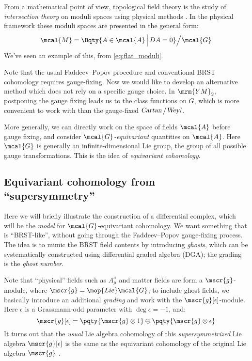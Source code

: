 \documentclass[a4paper
	,10pt
]{article}
\newcommand{\YM}{{\ensuremath{\mrm{YM}_2}}\xspace}
\begin{document}
	From a mathematical point of view, topological field theory is the study of \textit{intersection theory} on moduli spaces using physical methods \cite{Cordes:1994fc,Witten:1990bs}. In the physical framework these moduli spaces are presented in the general form:
	\begin{equation}
		\mcal{M}
		= \Bqty{
				A\in \mcal{A}
				\,\Big|\,
				DA = 0
			} \Big/ \mcal{G}
	\end{equation}
	We've seen an example of this, from \eqref{eq:flat_moduli}. 
	
	Note that the usual Faddeev--Popov procedure and conventional BRST cohomology requires gauge-fixing. Now we would like to develop an alternative method which does not rely on a specific gauge choice. In \YM, postponing the gauge fixing leads us to the class functions on $G$, which is more convenient to work with than the gauge-fixed $\textsl{Cartan} \,\big/ \textsl{Weyl}$. 
	
	More generally, we can directly work on the space of fields $\mcal{A}$ before gauge fixing, and consider \textit{$\mcal{G}$-equivariant} quantities on $\mcal{A}$. Here $\mcal{G}$ is generally an infinite-dimensional Lie group, the group of all possible gauge transformations. This is the idea of \textit{equivariant cohomology}. 
\subsection{Equivariant cohomology from ``supersymmetry''}
	Here we will briefly illustrate the construction of a differential complex, which will be the \textit{model} for $\mcal{G}$-equivariant cohomology. We want something that is ``BRST-like'', without going through the Faddeev--Popov gauge-fixing process. The idea is to mimic the BRST field contents by introducing \textit{ghosts}, which can be systematically constructed using differential graded algebra (DGA); the grading is the \textit{ghost number}. 
	
	Note that ``physical'' fields such as $A^a_\mu$ and matter fields are form a $\mscr{g}$-module, where $\mscr{g} = \mop{Lie} \mcal{G}$; to include ghost fields, we basically introduce an additional \textit{grading} and work with the $\mscr{g}[\epsilon]$-module. Here $\epsilon$ is a Grassmann-odd parameter with $\deg\epsilon = -1$, and:
	\begin{equation}
		\mscr{g}[\epsilon]
		= \pqty{\mscr{g} \otimes 1}
			\oplus \pqty{\mscr{g} \otimes \epsilon}
	\end{equation}
	It turns out that the \textit{usual} Lie algebra cohomology of this \textit{supersymmetrized} Lie algebra $\mscr{g}[\epsilon]$ is the same as the equivariant cohomology of the original Lie algebra $\mscr{g}$ \cite{Cordes:1994fc}. 
	
\end{document}

